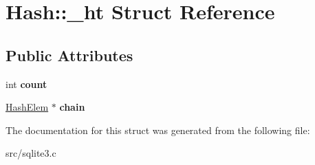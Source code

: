 \hypertarget{struct_hash_1_1__ht}{\section{Hash\-:\-:\-\_\-ht Struct Reference}
\label{struct_hash_1_1__ht}
}
\subsection*{Public Attributes}
\begin{DoxyCompactItemize}
\item 
\hypertarget{struct_hash_1_1__ht_a0677191178b6c7c5c6c2880f41cf24b1}{int {\bfseries count}}\label{struct_hash_1_1__ht_a0677191178b6c7c5c6c2880f41cf24b1}

\item 
\hypertarget{struct_hash_1_1__ht_a56fc145e7d38d9440d85ab2ea63a48ac}{\hyperlink{struct_hash_elem}{Hash\-Elem} $\ast$ {\bfseries chain}}\label{struct_hash_1_1__ht_a56fc145e7d38d9440d85ab2ea63a48ac}

\end{DoxyCompactItemize}


The documentation for this struct was generated from the following file\-:\begin{DoxyCompactItemize}
\item 
src/sqlite3.\-c\end{DoxyCompactItemize}
